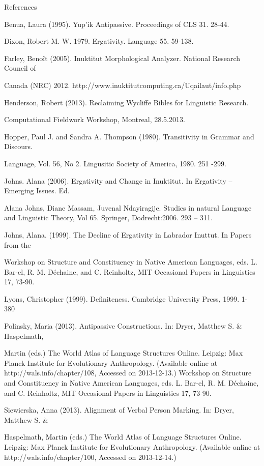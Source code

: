 \documentclass[12pt]{article}
\begin{document}
References


Benua, Laura (1995). Yup'ik Antipassive. Proceedings of CLS 31. 28-44.


Dixon, Robert M. W. 1979. Ergativity. Language 55. 59-138.

Farley, Benoît (2005). Inuktitut Morphological Analyzer.  National Research Council of 

	Canada (NRC) 2012. http://www.inuktitutcomputing.ca/Uqailaut/info.php

Henderson, Robert (2013). Reclaiming Wycliffe Bibles for Linguistic Research.

Computational Fieldwork Workshop, Montreal, 28.5.2013.


Hopper, Paul J. and Sandra A. Thompson (1980). Transitivity in Grammar and Discours. 

Language, Vol. 56, No 2. Lingusitic Society of America, 1980. 251 -299.


Johns. Alana (2006). Ergativity and Change in Inuktitut. In Ergativity – Emerging Issues. Ed. 

Alana Johns, Diane Massam, Juvenal Ndayiragije. Studies in natural Language and Linguistic Theory, Vol 65. Springer, Dodrecht:2006. 293 – 311.


Johns, Alana. (1999). The Decline of Ergativity in Labrador Inuttut. In Papers from the 

Workshop on Structure and Constituency in Native American Languages, eds. L. Bar-el, R. M. Déchaine, and C. Reinholtz, MIT Occasional Papers in Linguistics 17, 73-90.


Lyons, Christopher (1999). Definiteness. Cambridge University Press, 1999. 1- 380


Polinsky, Maria (2013). Antipassive Constructions. In: Dryer, Matthew S. & Haspelmath, 

Martin (eds.) The World Atlas of Language Structures Online. Leipzig: Max Planck Institute for Evolutionary Anthropology. (Available online at http://wals.info/chapter/108, Accessed on 2013-12-13.) Workshop on Structure and Constituency in Native American Languages, eds. L. Bar-el, R. M. Déchaine, and C. Reinholtz, MIT Occasional Papers in Linguistics 17, 73-90.

Siewierska, Anna (2013). Alignment of Verbal Person Marking. In: Dryer, Matthew S. & 
	
Haspelmath, Martin (eds.) The World Atlas of Language Structures Online. Leipzig: Max Planck Institute for Evolutionary Anthropology. (Available online at http://wals.info/chapter/100, Accessed on 2013-12-14.)
\end{document}

